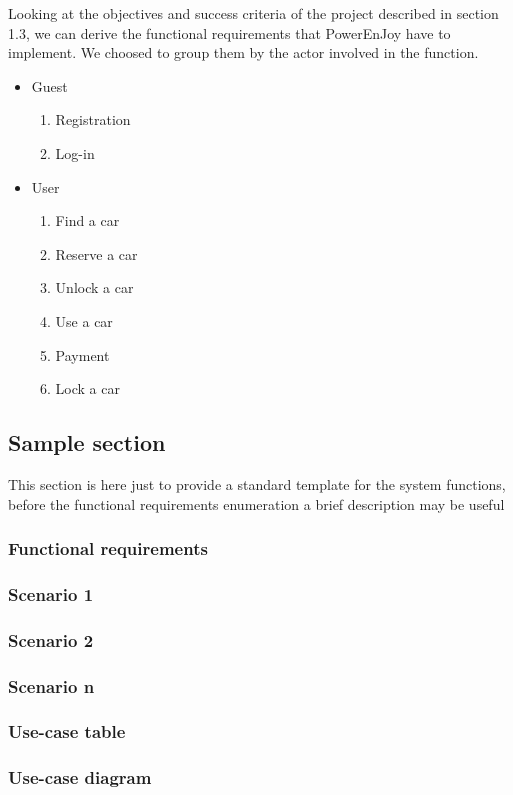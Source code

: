 Looking at the objectives and success criteria of the project described in section 1.3, we can derive the functional requirements that PowerEnJoy have to implement. We choosed to group them by the actor involved in the function.
\begin{itemize}
  \item Guest
  \begin{enumerate}
    \item Registration
    \item Log-in
  \end{enumerate}
  \item User
  \begin{enumerate}
    \item Find a car
    \item Reserve a car
    \item Unlock a car
    \item Use a car
    \item Payment
    \item Lock a car
  \end{enumerate}
\end{itemize}


\newpage
\subsection{Sample section}
This section is here just to provide a standard template for the system functions, before the functional requirements enumeration a brief description may be useful
\subsubsection{Functional requirements}
\subsubsection{Scenario 1}
\subsubsection{Scenario 2}
\subsubsection{Scenario n}
\subsubsection{Use-case table}
\subsubsection{Use-case diagram}
